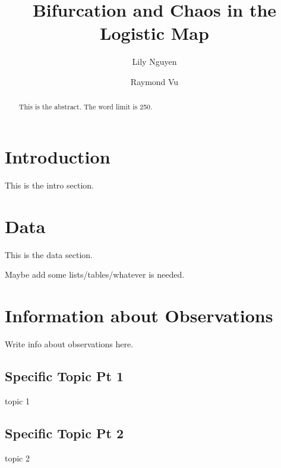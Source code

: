 \documentclass{aastex631}
\begin{document}
\title{Bifurcation and Chaos in the Logistic Map}
\author{Lily Nguyen}

\author{Raymond Vu}



\begin{abstract}
This is the abstract. The word limit is 250.
\end{abstract}

\section{Introduction} \label{sec:intro}
This is the intro section.

\section{Data} \label{sec:data}
This is the data section.

Maybe add some lists/tables/whatever is needed.



\section{Information about Observations}
Write info about observations here.

\subsection{Specific Topic Pt 1} \label{sec:subtopic1}
topic 1

\subsection{Specific Topic Pt 2} \label{sec:subtopic2}
topic 2
\end{document}
